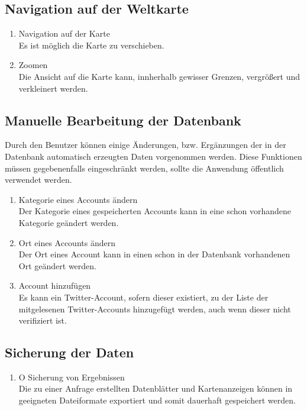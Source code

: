 \subsection{Navigation auf der Weltkarte}
\begin{enumerate}[ align=left, label={\textbf{\textbackslash F30\arabic*0\textbackslash}} ]
	\item Navigation auf der Karte \label{PF:Navigation} \\
	Es ist möglich die Karte zu verschieben.
	\item Zoomen \label{PF:Zoomen} \\
	Die Ansicht auf die Karte kann, innherhalb gewisser Grenzen, vergrößert und verkleinert werden.
\end{enumerate}	
\subsection{Manuelle Bearbeitung der Datenbank}
Durch den Benutzer können einige Änderungen, bzw. Ergänzungen der in der Datenbank automatisch erzeugten Daten vorgenommen werden. Diese Funktionen müssen gegebenenfalls eingeschränkt werden, sollte die Anwendung öffentlich verwendet werden.
\begin{enumerate}[ align=left, label={\textbf{\textbackslash F40\arabic*0\textbackslash}}]
	\item Kategorie eines Accounts ändern   \label{PF:KategorieAendern} \\
	Der Kategorie eines gespeicherten Accounts kann in eine schon vorhandene Kategorie geändert werden.
	\item Ort eines Accounts ändern \\
	Der Ort eines Account kann in einen schon in der Datenbank vorhandenen Ort geändert werden.
	\item Account hinzufügen \label{PF:AccountHinzu} \\
	Es kann ein Twitter-Account, sofern dieser existiert, zu der Liste der mitgelesenen Twitter-Accounts hinzugefügt werden, auch wenn dieser nicht verifiziert ist.
\end{enumerate}
\subsection{Sicherung der Daten}
\begin{enumerate}[ align=left, label={\textbf{\textbackslash F50\arabic*0\textbackslash}}]
	\item O Sicherung von Ergebnissen \label{PF:Sicherung} \\
	Die zu einer Anfrage erstellten Datenblätter und Kartenanzeigen können in geeigneten Dateiformate exportiert und somit dauerhaft gespeichert werden.
	
\end{enumerate}
